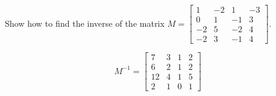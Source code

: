 
\begin{exerciseStatement}


Show how to find the inverse of the matrix \(M= \left[\begin{array}{cccc}
1 & -2 & 1 & -3 \\
0 & 1 & -1 & 3 \\
-2 & 5 & -2 & 4 \\
-2 & 3 & -1 & 4
\end{array}\right] \).


\end{exerciseStatement}
    
\begin{exerciseAnswer} 
\[M^{-1}= \left[\begin{array}{cccc}
7 & 3 & 1 & 2 \\
6 & 2 & 1 & 2 \\
12 & 4 & 1 & 5 \\
2 & 1 & 0 & 1
\end{array}\right] \]
\end{exerciseAnswer}
    
